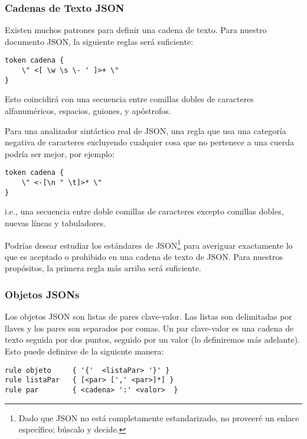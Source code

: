 \subsubsection{Cadenas de Texto JSON}

Existen muchos patrones para definir una cadena de texto. 
Para nuestro documento JSON, la siguiente reglas será suficiente:

\begin{verbatim}
token cadena {
    \" <[ \w \s \- ' ]>+ \" 
}
\end{verbatim}

Esto coincidirá con una secuencia entre comillas dobles de
caracteres alfanuméricos, espacios, guiones, y apóstrofos.

Para una analizador sintáctico real de JSON, una regla que usa
una categoría negativa de caracteres excluyendo cualquier cosa que
no pertenece a una cuerda podría ser mejor, por ejemplo:

\begin{verbatim}
token cadena {
    \" <-[\n " \t]>* \"
}
\end{verbatim}

i.e., una secuencia entre doble comillas de caracteres excepto 
comillas dobles, nuevas líneas y tabuladores.

Podrías desear estudiar los estándares de JSON\footnote{
Dado que JSON no está completamente estandarizado, no proveeré
un enlace específico; búscalo y decide.} para averiguar 
exactamente lo que es aceptado o prohibido en una cadena de texto
de JSON. Para nuestros propósitos, la primera regla más arriba será
suficiente.

\subsubsection{Objetos JSONs}

Los objetos JSON son listas de pares clave-valor. Las listas
son delimitadas por llaves y los pares son separados por comas.
Un par clave-valor es una cadena de texto seguida por dos puntos,
seguido por un valor (lo definiremos más adelante). Esto puede 
definirse de la siguiente manera:

\begin{verbatim}
rule objeto     { '{'  <listaPar> '}' }
rule listaPar   { [<par> [',' <par>]*] }
rule par        { <cadena> ':' <valor>  }
\end{verbatim}

